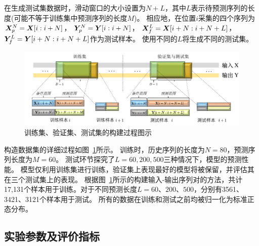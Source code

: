 在生成测试集数据时，滑动窗口的大小设置为$N+L$，其中$L$表示待预测序列的长度(可能不等于训练集中预测序列的长度$M$)。
相应地，在位置$i$采集的四个序列为$\boldsymbol X _p^N =\boldsymbol X[i:i+N]$， $\boldsymbol Y _p^N =\boldsymbol Y[i:i+N]$， $\boldsymbol X _f^L=\boldsymbol X[i+N:i+N+L]$， $\boldsymbol Y _f^L=\boldsymbol Y[i+N:i+N+L]$作为测试样本。
使用不同的$L$将生成不同的测试集。

\begin{figure}[t]
    \centering
    \includegraphics[width=\linewidth]{figures/chapter3/dataset.pdf}
    \caption{
    训练集、验证集、测试集的构建过程图示
    }
    \label{fig:dataset}
\end{figure}


构造数据集的详细过程如图~\ref{fig:dataset}所示。
训练时，历史序列的长度为$N=80$，预测序列长度为$M=60$。
测试环节探究了$L=60, 200, 500$三种情况下，模型的预测性能。
模型仅利用训练集进行训练，验证集上表现最好的模型将被保留，并评估其在三个测试集上的表现。
根据图~\ref{fig:dataset}所示的构建输入-输出序列对的方法，共计17,131个样本用于训练。对于不同预测长度$L=60、200、500$，分别有3561、3421、3121个样本用于测试。
所有的数据在训练和测试之前均被归一化为标准正态分布。

\subsection{实验参数及评价指标}

